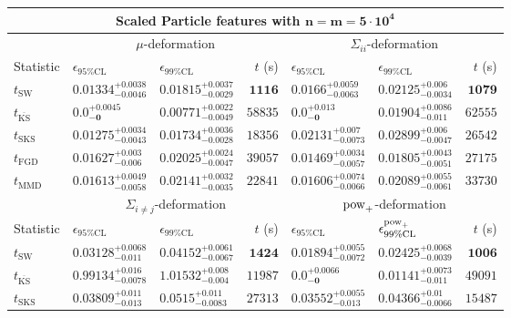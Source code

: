 \begin{tabular}{l|llr|llr}
	\toprule
	\multicolumn{7}{c}{{\bf Scaled Particle features with $\mathbf{n=m=5\cdot 10^{4}}$}} \\
	\toprule
	\multicolumn{1}{c}{} & \multicolumn{3}{c}{$\mu$-deformation} & \multicolumn{3}{c}{$\Sigma_{ii}$-deformation} \\
	Statistic & $\epsilon_{95\%\mathrm{CL}}$ & $\epsilon_{99\%\mathrm    {CL}}$ & $t$ (s) & $\epsilon_{95\%\mathrm{CL}}$ & $\epsilon_{99\%\mathrm{CL}}$ & $t$ (s) \\
	\midrule
	$t_{\mathrm{SW}}$ & $0.01334_{-0.0046}^{+0.0038}$ & $0.01815_{-0.0029}^{+0.0037}$ & ${\mathbf{1116}}$ & $0.0166_{-0.0063}^{+0.0059}$ & $0.02125_{-0.0034}^{+0.006}$ & ${\mathbf{1079}}$ \\
	$t_{\overline{\mathrm{KS}}}$ & ${\mathbf{0.0_{-0}^{+0.0045}}}$ & ${\mathbf{0.00771_{-0.0049}^{+0.0022}}}$ & $58835$ & ${\mathbf{0.0_{-0}^{+0.013}}}$ & $0.01904_{-0.011}^{+0.0086}$ & $62555$ \\
	$t_{\mathrm{SKS}}$ & $0.01275_{-0.0043}^{+0.0034}$ & $0.01734_{-0.0028}^{+0.0036}$ & $18356$ & $0.02131_{-0.0073}^{+0.007}$ & $0.02899_{-0.0047}^{+0.006}$ & $26542$ \\
	$t_{\mathrm{FGD}}$ & $0.01627_{-0.006}^{+0.003}$ & $0.02025_{-0.0047}^{+0.0024}$ & $39057$ & $0.01469_{-0.0057}^{+0.0034}$ & ${\mathbf{0.01805_{-0.0051}^{+0.0043}}}$ & $27175$ \\
	$t_{\mathrm{MMD}}$ & $0.01613_{-0.0058}^{+0.0049}$ & $0.02141_{-0.0035}^{+0.0032}$ & $22841$ & $0.01606_{-0.0066}^{+0.0074}$ & $0.02089_{-0.0061}^{+0.0055}$ & $33730$ \\
	\toprule
	\multicolumn{1}{c}{} & \multicolumn{3}{c}{$\Sigma_{i\neq j}$-deformation} & \multicolumn{3}{c}{$\rm{pow}_{+}$-deformation} \\
	Statistic & $\epsilon_{95\%\mathrm{CL}}$ & $\epsilon_{99\%\mathrm{CL}}$ & $t$ (s) & $\epsilon_{95\%\mathrm{CL}}$ & $\epsilon^{\rm   {pow}_{+}}_{99\%\mathrm{CL}}$ & $t$ (s) \\
	\midrule
	$t_{\mathrm{SW}}$ & $0.03128_{-0.011}^{+0.0068}$ & $0.04152_{-0.0067}^{+0.0061}$ & ${\mathbf{1424}}$ & $0.01894_{-0.0072}^{+0.0055}$ & $0.02425_{-0.0039}^{+0.0068}$ & ${\mathbf{1006}}$ \\
	$t_{\overline{\mathrm{KS}}}$ & $0.99134_{-0.0078}^{+0.016}$ & $1.01532_{-0.004}^{+0.008}$ & $11987$ & ${\mathbf{0.0_{-0}^{+0.0066}}}$ & ${\mathbf{0.01141_{-0.011}^{+0.0073}}}$ & $49091$ \\
	$t_{\mathrm{SKS}}$ & $0.03809_{-0.013}^{+0.011}$ & $0.0515_{-0.0083}^{+0.011}$ & $27313$ & $0.03552_{-0.013}^{+0.0055}$ & $0.04366_{-0.0066}^{+0.01}$ & $15487$ \\

\end{tabular}
